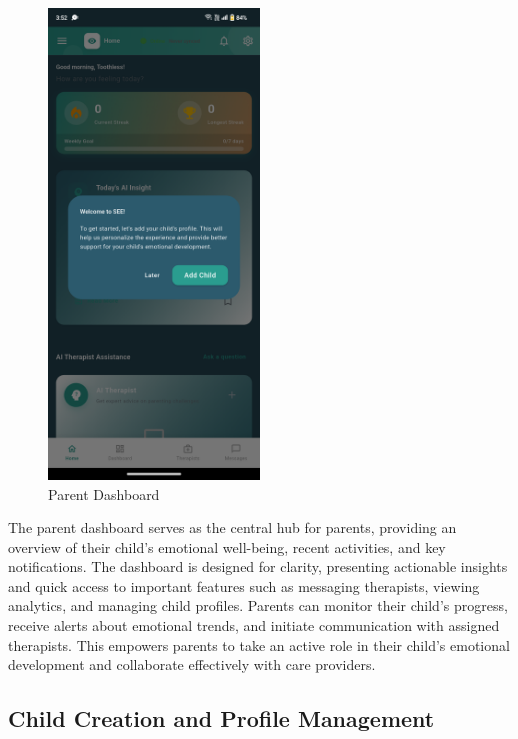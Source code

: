 \documentclass[12pt,a4paper]{article}
\newcommand{\sectiontitle}[1]{\subsection{#1}}
\begin{document}
\begin{figure}[H]
    \centering
    \includegraphics[width=0.5\textwidth]{Screenshots/parentdashboard.png}
    \caption{Parent Dashboard}
    \label{fig:parent-dashboard}
\end{figure}
The parent dashboard serves as the central hub for parents, providing an overview of their child's emotional well-being, recent activities, and key notifications. The dashboard is designed for clarity, presenting actionable insights and quick access to important features such as messaging therapists, viewing analytics, and managing child profiles. Parents can monitor their child's progress, receive alerts about emotional trends, and initiate communication with assigned therapists. This empowers parents to take an active role in their child's emotional development and collaborate effectively with care providers.

\sectiontitle{Child Creation and Profile Management}
\end{document}
